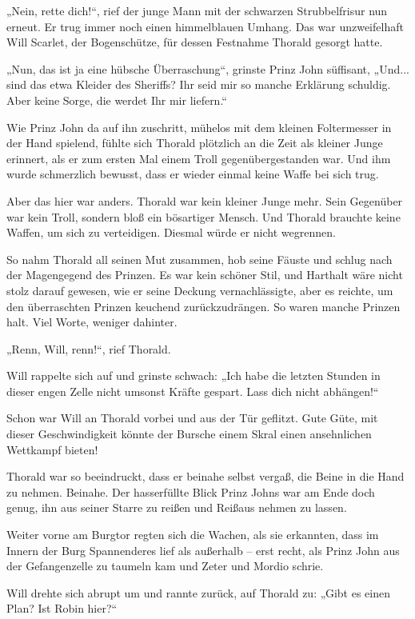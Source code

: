 „Nein, rette dich!“, rief der junge Mann mit der schwarzen Strubbelfrisur nun erneut. Er trug immer noch einen himmelblauen Umhang. Das war unzweifelhaft Will Scarlet, der Bogenschütze, für dessen Festnahme Thorald gesorgt hatte.

„Nun, das ist ja eine hübsche Überraschung“, grinste Prinz John süffisant, „Und... sind das etwa Kleider des Sheriffs? Ihr seid mir so manche Erklärung schuldig. Aber keine Sorge, die werdet Ihr mir liefern.“

Wie Prinz John da auf ihn zuschritt, mühelos mit dem kleinen Foltermesser in der Hand spielend, fühlte sich Thorald plötzlich an die Zeit als kleiner Junge erinnert, als er zum ersten Mal einem Troll gegenübergestanden war. Und ihm wurde schmerzlich bewusst, dass er wieder einmal keine Waffe bei sich trug.

Aber das hier war anders. Thorald war kein kleiner Junge mehr. Sein Gegenüber war kein Troll, sondern bloß ein bösartiger Mensch. Und Thorald brauchte keine Waffen, um sich zu verteidigen. Diesmal würde er nicht wegrennen.

So nahm Thorald all seinen Mut zusammen, hob seine Fäuste und schlug nach der Magengegend des Prinzen. Es war kein schöner Stil, und Harthalt wäre nicht stolz darauf gewesen, wie er seine Deckung vernachlässigte, aber es reichte, um den überraschten Prinzen keuchend zurückzudrängen. So waren manche Prinzen halt. Viel Worte, weniger dahinter.

„Renn, Will, renn!“, rief Thorald.

Will rappelte sich auf und grinste schwach: „Ich habe die letzten Stunden in dieser engen Zelle nicht umsonst Kräfte gespart. Lass dich nicht abhängen!“

Schon war Will an Thorald vorbei und aus der Tür geflitzt. Gute Güte, mit dieser Geschwindigkeit könnte der Bursche einem Skral einen ansehnlichen Wettkampf bieten!

Thorald war so beeindruckt, dass er beinahe selbst vergaß, die Beine in die Hand zu nehmen. Beinahe. Der hasserfüllte Blick Prinz Johns war am Ende doch genug, ihn aus seiner Starre zu reißen und Reißaus nehmen zu lassen.

Weiter vorne am Burgtor regten sich die Wachen, als sie erkannten, dass im Innern der Burg Spannenderes lief als außerhalb – erst recht, als Prinz John aus der Gefangenzelle zu taumeln kam und Zeter und Mordio schrie.

Will drehte sich abrupt um und rannte zurück, auf Thorald zu: „Gibt es einen Plan? Ist Robin hier?“

